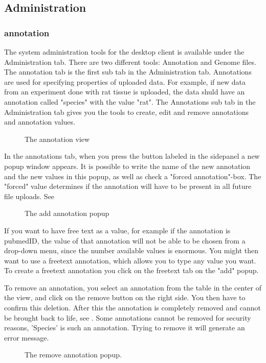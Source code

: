 \subsection{Administration}
\subsubsection{annotation}

The system administration tools for the desktop client is available under the Administration tab. There are two different tools: Annotation and Genome files. The annotation tab is the first sub tab in the Administration tab. Annotations are used for specifying properties of uploaded data. For example, if new data from an experiment done with rat tissue is uploaded, the data shuld have an annotation called "species" with the value "rat". The Annotations sub tab in the Administration tab gives you the tools to create, edit and remove annotations and annotation values. 
\begin{figure}[htb]
	\caption{The annotation view}
	\label{fig:annotationsView}
\end{figure}

In the annotations tab, when you press the button labeled  in the sidepanel a new popup window appears. It is possible to write the name of the new annotation and the new values in this popup, as well as check a "forced annotation"-box. The "forced" value determines if the annotation will have to be present in all future file uploads. See 

\begin{figure}[htb]
	\caption{The add annotation popup}
	\label{fig:adm_addAnnotationPopup}
\end{figure}

If you want to have free text as a value, for example if the annotation is pubmedID, the value of that annotation will not be able to be chosen from a drop-down menu, since the number available values is enormous. You might then want to use a freetext annotation, which allows you to type any value you want. To create a freetext annotation you click on the freetext tab on the "add" popup. 


To remove an annotation, you select an annotation from the table in the center of the view, and click on the remove button on the right side. You then have to confirm this deletion. After this the annotation is completely removed and cannot be brought back to life, see . Some annotations cannot be removed for security reasons, 'Species' is such an annotation. Trying to remove it will generate an error message.
\begin{figure}[h!]
\caption{The remove annotation popup.}
\label{fig:adm_desktopRemoveAnnotation}
\end{figure}

